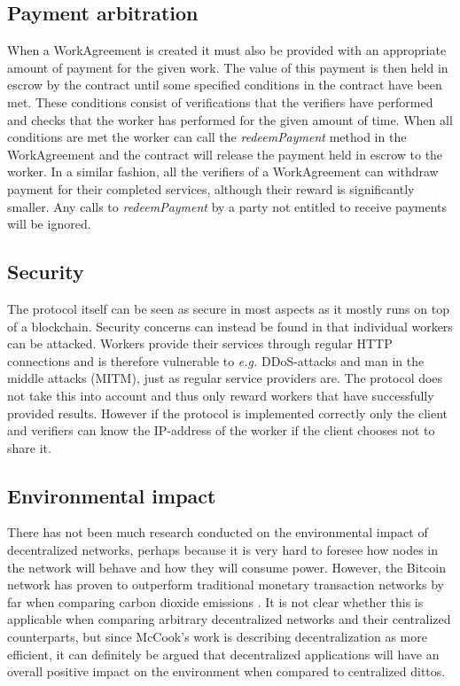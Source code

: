 \subsection{Payment arbitration}
When a WorkAgreement is created it must also be provided with an appropriate amount of payment for the given work. The value of this payment is then held in escrow by the contract until some specified conditions in the contract have been met. These conditions consist of verifications that the verifiers have performed and checks that the worker has performed for the given amount of time. When all conditions are met the worker can call the \textit{redeemPayment} method in the WorkAgreement and the contract will release the payment held in escrow to the worker. In a similar fashion, all the verifiers of a WorkAgreement can withdraw payment for their completed services, although their reward is significantly smaller. Any calls to \textit{redeemPayment} by a party not entitled to receive payments will be ignored.

\subsection{Security}
The protocol itself can be seen as secure in most aspects as it mostly runs on top of a blockchain. Security concerns can instead be found in that individual workers can be attacked. Workers provide their services through regular HTTP connections and is therefore vulnerable to \textit{e.g.} DDoS-attacks and man in the middle attacks (MITM), just as regular service providers are. The protocol does not take this into account and thus only reward workers that have successfully provided results. However if the protocol is implemented correctly only the client and verifiers can know the IP-address of the worker if the client chooses not to share it.

\subsection{Environmental impact}
There has not been much research conducted on the environmental impact of decentralized networks, perhaps because it is very hard to foresee how nodes in the network will behave and how they will consume power. However, the Bitcoin network has proven to outperform traditional monetary transaction networks by far when comparing carbon dioxide emissions \cite{cook}. It is not clear whether this is applicable when comparing arbitrary decentralized networks and their centralized counterparts, but since McCook's work is describing decentralization as more efficient, it can definitely be argued that decentralized applications will have an overall positive impact on the environment when compared to centralized dittos.

